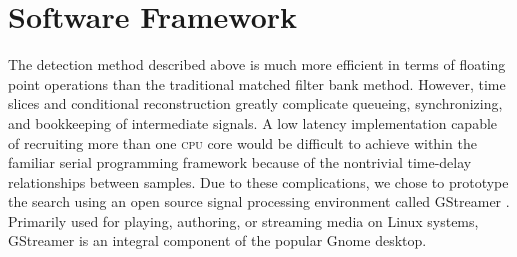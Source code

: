 \section{Software Framework}
\label{SECIII}\label{sec:analysis}

The detection method described above is much more efficient in terms of
floating point operations than the traditional matched filter bank method.
However, time slices and conditional reconstruction greatly complicate
queueing, synchronizing, and bookkeeping of intermediate signals.  A low
latency implementation capable of recruiting more than one \textsc{cpu} core
would be difficult to achieve within the familiar serial programming framework
because of the nontrivial time-delay relationships between samples.  Due to
these complications, we chose to prototype the search using an open source
signal processing environment called GStreamer \cite{gstreamer}.  Primarily
used for playing, authoring, or streaming media on Linux systems, GStreamer is
an integral component of the popular Gnome desktop.

\begin{comment}


\begin{figure*}[h!]
\begin{center}
\texttt{[image: figures/flow\_chart.pdf]}
\caption{\label{f:flowchart} 
}
\end{center}
\end{figure*}

\end{comment}
